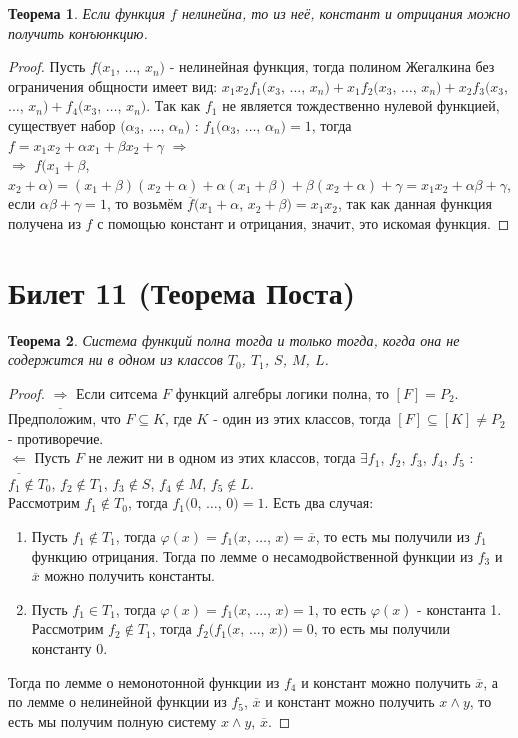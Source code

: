 \documentclass[a4paper, 12pt]{article}
\renewcommand{\phi}{\varphi}
\theoremstyle{definition}
\theoremstyle{plain}
\newtheorem*{theorem}{Теорема}
\theoremstyle{remark}
\begin{document}
  \begin{theorem}
    Если функция $f$ нелинейна, то из неё, констант и отрицания можно получить конъюнкцию.
  \end{theorem}
  \begin{proof}
    Пусть $f(x_1$, $\ldots$, $x_n)$ - нелинейная функция, тогда полином Жегалкина без ограничения общности имеет вид: $x_1x_2f_1(x_3$, $\ldots$, $x_n)+x_1f_2(x_3$, $\ldots$, $x_n)+x_2f_3(x_3$, $\ldots$, $x_n)+f_4(x_3$, $\ldots$, $x_n)$. Так как $f_1$ не является тождественно нулевой функцией, существует набор $(\alpha_3$, $\ldots$, $\alpha_n)$ : $f_1(\alpha_3$, $\ldots$, $\alpha_n)=1$, тогда $f=x_1x_2+\alpha x_1+\beta x_2+\gamma$ $\Longrightarrow$\\
    $\Longrightarrow$ $f(x_1+\beta$, $x_2+\alpha)=(x_1+\beta)(x_2+\alpha)+\alpha(x_1+\beta)+\beta(x_2+\alpha)+\gamma=x_1x_2+\alpha\beta+\gamma$, если $\alpha\beta+\gamma=1$, то возьмём $\overline{f}(x_1+\alpha$, $x_2+\beta)=x_1x_2$,  так как данная функция получена из $f$ с помощью констант и отрицания, значит, это искомая функция.
  \end{proof}
  \section{Билет 11 (Теорема Поста)}
  \begin{theorem}
    Система функций полна тогда и только тогда, когда она не содержится ни в одном из классов $T_0$, $T_1$, $S$, $M$, $L$.
  \end{theorem}
  \begin{proof}
    $\underline{\Longrightarrow}$ Если ситсема $F$ функций алгебры логики полна, то $[F]=P_2$. Предположим, что $F\subseteq K$, где $K$ - один из этих классов, тогда $[F]\subseteq[K]\neq P_2$ - противоречие.\\
    $\underline{\Longleftarrow}$ Пусть $F$ не лежит ни в одном из этих классов, тогда $\exists f_1$, $f_2$, $f_3$, $f_4$, $f_5$ : $f_1\notin T_0$, $f_2\notin T_1$, $f_3\notin S$, $f_4\notin M$, $f_5\notin L$.\\
    Рассмотрим $f_1\notin T_0$, тогда $f_1(0$, $\ldots$, $0)=1$. Есть два случая:
    \begin{enumerate}
      \item Пусть $f_1\notin T_1$, тогда $\phi(x)=f_1(x$, $\ldots$, $x)=\overline{x}$, то есть мы получили из $f_1$ функцию отрицания. Тогда по лемме о несамодвойственной функции из $f_3$ и $\overline{x}$ можно получить константы.
      \item Пусть $f_1\in T_1$, тогда $\phi(x)=f_1(x$, $\ldots$, $x)=1$, то есть $\phi(x)$ - константа 1. Рассмотрим $f_2\notin T_1$, тогда $f_2(f_1(x$, $\ldots$, $x))=0$, то есть мы получили константу 0.
    \end{enumerate}
    Тогда по лемме о немонотонной функции из $f_4$ и констант можно получить $\overline{x}$, а по лемме о нелинейной функции из $f_5$, $\overline{x}$ и констант можно получить $x\wedge y$, то есть мы получим полную систему {$x\wedge y$, $\overline{x}$}.
  \end{proof}
\end{document}

